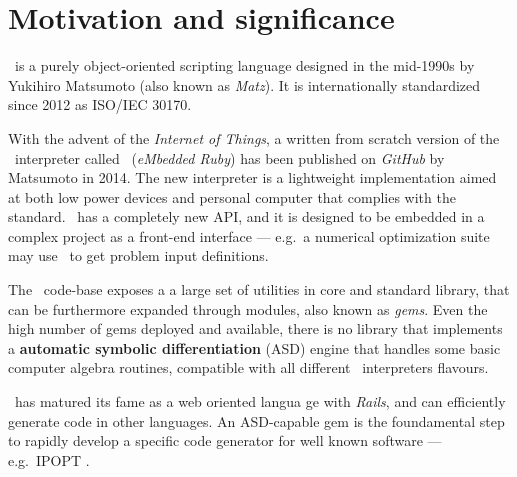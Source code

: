 \section{Motivation and significance}
\label{sec:motivation}

\Ruby \cite{flanagan2008ruby}~is a purely object-oriented scripting language designed in the mid-1990s by Yukihiro Matsumoto (also known as \emph{Matz}). It is internationally standardized since 2012 as ISO/IEC 30170.

With the advent of the \emph{Internet of Things}, a written from scratch version of the \Ruby~interpreter called \Mruby~(\emph{eMbedded Ruby}) \cite{tanaka2015mruby} has been published on \emph{GitHub} by Matsumoto in 2014. The new interpreter is a lightweight implementation aimed at both low power devices and personal computer that complies with the standard\cite{iso30170}. \Mruby~has a completely new API, and it is designed to be embedded in a complex project as a front-end interface --- e.g.\ a numerical optimization suite may use \Mruby~to get problem input definitions.

The \Ruby~code-base exposes a a large set of utilities in core and standard library, that can be furthermore expanded through modules, also known as \emph{gems}. Even the high number of gems deployed and available, there is no library that implements a \textbf{automatic symbolic differentiation} (ASD) \cite{tolsma1998computational} engine that handles some basic computer algebra routines, compatible with all different \Ruby~interpreters flavours.

\Ruby~has matured its fame as a web oriented langua
ge with \emph{Rails}, and can efficiently generate code in other languages. An ASD-capable gem is the foundamental step to rapidly develop a specific code generator for well known software --- e.g.\ IPOPT \cite{wachter2009ipopt}\@.

